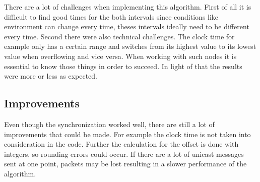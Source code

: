 \documentclass{llncs}
\begin{document}
There are a lot of challenges when implementing this algorithm. First of all it is difficult to find good times for the both intervals since conditions like environment can change every time, theses intervals ideally need to be different every time. Second there were also technical challenges. The clock time for example only has a certain range and switches from its highest value to its lowest value when overflowing and vice versa. When working with such nodes it is essential to know those things in order to succeed. In light of that the results were more or less as expected.

\subsection{Improvements}
Even though the synchronization worked well, there are still a lot of improvements that could be made. 
For example the clock time is not taken into consideration in the code.
Further the calculation for the offset is done with integers, so rounding errors could occur. 
If there are a lot of unicast messages sent at one point, packets may be lost resulting in a slower performance of the algorithm.






%
%

\end{document}
